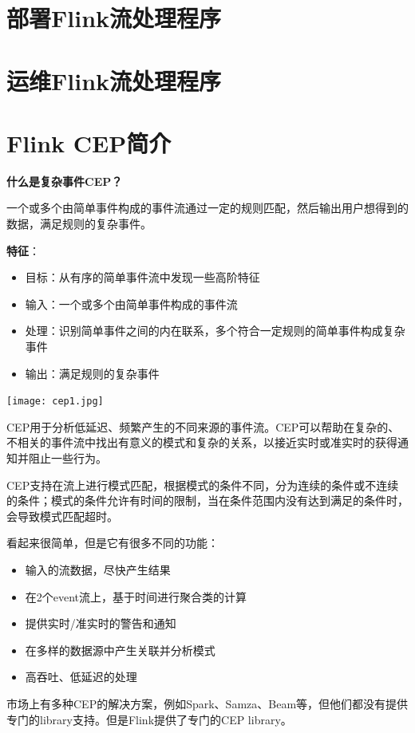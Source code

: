 \documentclass[oneside]{ctexbook}
\begin{document}
\chapter{部署Flink流处理程序}

\chapter{运维Flink流处理程序}

\chapter{Flink CEP简介}

\textbf{什么是复杂事件CEP？}

一个或多个由简单事件构成的事件流通过一定的规则匹配，然后输出用户想得到的数据，满足规则的复杂事件。

\textbf{特征}：

\begin{itemize}
\item 目标：从有序的简单事件流中发现一些高阶特征
\item 输入：一个或多个由简单事件构成的事件流
\item 处理：识别简单事件之间的内在联系，多个符合一定规则的简单事件构成复杂事件
\item 输出：满足规则的复杂事件
\end{itemize}

\noindent \texttt{[image: cep1.jpg]}

CEP用于分析低延迟、频繁产生的不同来源的事件流。CEP可以帮助在复杂的、不相关的事件流中找出有意义的模式和复杂的关系，以接近实时或准实时的获得通知并阻止一些行为。

CEP支持在流上进行模式匹配，根据模式的条件不同，分为连续的条件或不连续的条件；模式的条件允许有时间的限制，当在条件范围内没有达到满足的条件时，会导致模式匹配超时。

看起来很简单，但是它有很多不同的功能：

\begin{itemize}
\item 输入的流数据，尽快产生结果
\item 在2个event流上，基于时间进行聚合类的计算
\item 提供实时/准实时的警告和通知
\item 在多样的数据源中产生关联并分析模式
\item 高吞吐、低延迟的处理
\end{itemize}

市场上有多种CEP的解决方案，例如Spark、Samza、Beam等，但他们都没有提供专门的library支持。但是Flink提供了专门的CEP library。
\end{document}
